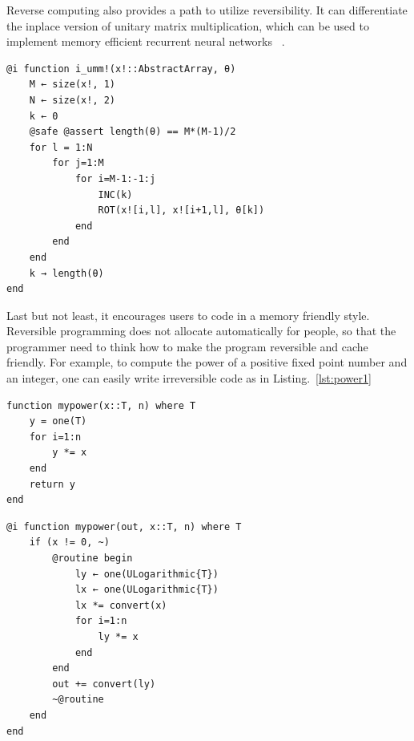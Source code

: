 \documentclass{article}
\newcommand{\<}{\langle}
\renewcommand{\>}{\rangle}
\newcommand{\Lst}[1]{Listing.~\ref{#1}}
\theoremstyle{definition}\newtheorem{definition}{\textit{Definition}}
\begin{document}
Reverse computing also provides a path to utilize reversibility.
It can differentiate the inplace version of unitary matrix multiplication, which can be used to implement memory efficient recurrent neural networks ~\cite{Jing2016}.

\begin{minipage}{.88\columnwidth}
\begin{lstlisting}[mathescape=true,caption={Two level decomposition of a unitary matrix.},label={lst:affine}]
@i function i_umm!(x!::AbstractArray, θ)
    M ← size(x!, 1)
    N ← size(x!, 2)
    k ← 0
    @safe @assert length(θ) == M*(M-1)/2
    for l = 1:N
        for j=1:M
            for i=M-1:-1:j
                INC(k)
                ROT(x![i,l], x![i+1,l], θ[k])
            end
        end
    end
    k → length(θ)
end
\end{lstlisting}
\end{minipage}

Last but not least, it encourages users to code in a memory friendly style.
Reversible programming does not allocate automatically for people, so that the programmer need to think how to make the program reversible and cache friendly.
For example, to compute the power of a positive fixed point number and an integer, one can easily write irreversible code as in \Lst{lst:power1}

\begin{minipage}{.45\columnwidth}
\begin{lstlisting}[mathescape=true,caption={A regular power function.},label={lst:power1}]
function mypower(x::T, n) where T
    y = one(T)
    for i=1:n
        y *= x
    end
    return y
end
\end{lstlisting}
\end{minipage}\hfill
\begin{minipage}{.45\columnwidth}
\begin{lstlisting}[mathescape=true,caption={A reversible power function.},label={lst:power2}]
@i function mypower(out, x::T, n) where T
    if (x != 0, ~)
        @routine begin
            ly ← one(ULogarithmic{T})
            lx ← one(ULogarithmic{T})
            lx *= convert(x)
            for i=1:n
                ly *= x
            end
        end
        out += convert(ly)
        ~@routine
    end
end
\end{lstlisting}
\end{minipage}
\end{document}
